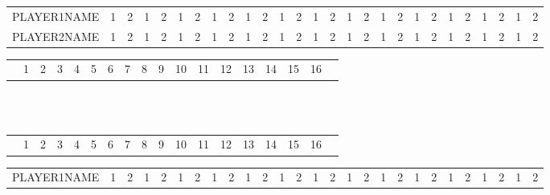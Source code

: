 \begin{table}
\begin{tabular}{r|c|c|c|c|c|c|c|c|c|c|c|c|c|c|c|c|c|c|c|c|c|c|c|c|c|c|}
\cline{2-27}
\footnotesize PLAYER1NAME & \footnotesize 1 & \footnotesize 2 & \footnotesize 1 & \footnotesize 2 & \footnotesize 1 & \footnotesize 2 & \footnotesize 1 & \footnotesize 2 & \footnotesize 1 & \footnotesize 2 & \footnotesize 1 & \footnotesize 2 & \footnotesize 1 & \footnotesize 2 & \footnotesize 1 & \footnotesize 2 & \footnotesize 1 & \footnotesize 2 & \footnotesize 1 & \footnotesize 2 & \footnotesize 1 & \footnotesize 2 & \footnotesize 1 & \footnotesize 2 & \footnotesize 1 & \footnotesize 2 \\
\cline{1-27}
\cline{1-27}
\footnotesize PLAYER2NAME & \footnotesize 1 & \footnotesize 2 & \footnotesize 1 & \footnotesize 2 & \footnotesize 1 & \footnotesize 2 & \footnotesize 1 & \footnotesize 2 & \footnotesize 1 & \footnotesize 2 & \footnotesize 1 & \footnotesize 2 & \footnotesize 1 & \footnotesize 2 & \footnotesize 1 & \footnotesize 2 & \footnotesize 1 & \footnotesize 2 & \footnotesize 1 & \footnotesize 2 & \footnotesize 1 & \footnotesize 2 & \footnotesize 1 & \footnotesize 2 & \footnotesize 1 & \footnotesize 2 \\
\cline{2-27}
\end{tabular}
\begin{tabular}{p{5cm}|c|c|c|c|c|c!{\vrule width 2pt}c|c|c|c|c|c|c|c|c|c!{\vrule width 3pt}p{1cm}!{\vrule width 3pt}}
& 1 & 2 & 3 & 4 & 5 & 6 & 7 & 8 & 9 & 10 & 11 & 12 & 13 & 14 & 15 & 16 & \\
\end{tabular}
~\\\\
\begin{tabular}{p{5cm}|c|c|c|c|c|c!{\vrule width 2pt}c|c|c|c|c|c|c|c|c|c!{\vrule width 3pt}p{1cm}!{\vrule width 3pt}}
& 1 & 2 & 3 & 4 & 5 & 6 & 7 & 8 & 9 & 10 & 11 & 12 & 13 & 14 & 15 & 16 & \\
\end{tabular}
\begin{tabular}{r|c|c|c|c|c|c|c|c|c|c|c|c|c|c|c|c|c|c|c|c|c|c|c|c|c|c|}
\cline{2-27}
\footnotesize PLAYER1NAME & \footnotesize 1 & \footnotesize 2 & \footnotesize 1 & \footnotesize 2 & \footnotesize 1 & \footnotesize 2 & \footnotesize 1 & \footnotesize 2 & \footnotesize 1 & \footnotesize 2 & \footnotesize 1 & \footnotesize 2 & \footnotesize 1 & \footnotesize 2 & \footnotesize 1 & \footnotesize 2 & \footnotesize 1 & \footnotesize 2 & \footnotesize 1 & \footnotesize 2 & \footnotesize 1 & \footnotesize 2 & \footnotesize 1 & \footnotesize 2 & \footnotesize 1 & \footnotesize 2 \\

\end{tabular}
\end{table}
